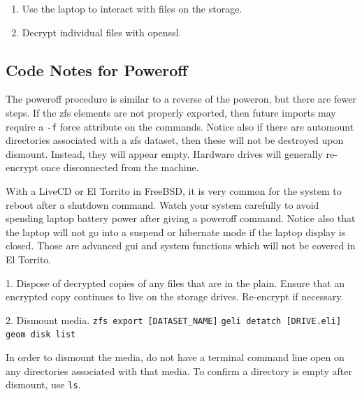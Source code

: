 \begin{enumerate}
\item Use the laptop to interact with files on the storage.

\item Decrypt individual files with openssl.
\end{enumerate}

\subsection{Code Notes for Poweroff}
The poweroff procedure is similar to a reverse of the poweron, but there are fewer steps.  If the \gls{zfs} elements are not properly exported, then future imports may require a \texttt{-f} force attribute on the commands.  Notice also if there are automount directories associated with a \gls{zfs} \gls{dataset}, then these will not be destroyed upon dismount.  Instead, they will appear empty.  Hardware drives will generally re-\gls{encrypt} once disconnected from the machine.

With a LiveCD or El Torrito in FreeBSD, it is very common for the system to reboot after a shutdown command.  Watch your system carefully to avoid spending laptop battery power after giving a poweroff command.  Notice also that the laptop will not go into a suspend or hibernate mode if the laptop display is closed.  Those are advanced gui and system functions which will not be covered in El Torrito.

1.  Dispose of decrypted copies of any files that are in the plain.  Ensure that an encrypted copy continues to live on the storage drives.  Re-\gls{encrypt} if necessary.

2.  Dismount media.
\texttt{zfs export [DATASET\_NAME]}
\texttt{geli detatch [DRIVE.eli]}
\texttt{geom disk list}

In order to dismount the media, do not have a terminal command line open on any directories associated with that media.  To confirm a directory is empty after dismount, use \texttt{ls}.



